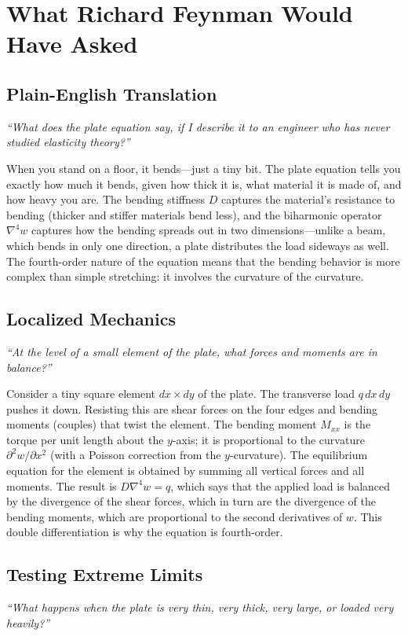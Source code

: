 \documentclass[11pt,openright]{book}
\begin{document}
\section*{What Richard Feynman Would Have Asked}

\subsection*{Plain-English Translation}
\textit{``What does the plate equation say, if I describe it to an engineer who has never studied elasticity theory?''}

When you stand on a floor, it bends---just a tiny bit. The plate equation tells you exactly how much it bends, given how thick it is, what material it is made of, and how heavy you are. The bending stiffness $D$ captures the material's resistance to bending (thicker and stiffer materials bend less), and the biharmonic operator $\nabla^{4}w$ captures how the bending spreads out in two dimensions---unlike a beam, which bends in only one direction, a plate distributes the load sideways as well. The fourth-order nature of the equation means that the bending behavior is more complex than simple stretching: it involves the curvature of the curvature.

\subsection*{Localized Mechanics}
\textit{``At the level of a small element of the plate, what forces and moments are in balance?''}

Consider a tiny square element $dx \times dy$ of the plate. The transverse load $q\,dx\,dy$ pushes it down. Resisting this are shear forces on the four edges and bending moments (couples) that twist the element. The bending moment $M_{xx}$ is the torque per unit length about the $y$-axis; it is proportional to the curvature $\partial^{2}w/\partial x^{2}$ (with a Poisson correction from the $y$-curvature). The equilibrium equation for the element is obtained by summing all vertical forces and all moments. The result is $D\nabla^{4}w = q$, which says that the applied load is balanced by the divergence of the shear forces, which in turn are the divergence of the bending moments, which are proportional to the second derivatives of $w$. This double differentiation is why the equation is fourth-order.

\subsection*{Testing Extreme Limits}
\textit{``What happens when the plate is very thin, very thick, very large, or loaded very heavily?''}
\end{document}
